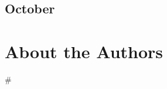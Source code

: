 \documentclass[12pt,letterpaper,oneside]{memoir}
\newcommand\secdiv{
  \begin{center}
    \#
  \end{center}
}
\begin{document}
  \chapter{October}
  
  
  
  

  \part{About the Authors}
  

  \newpage
  \secdiv
\end{document}
